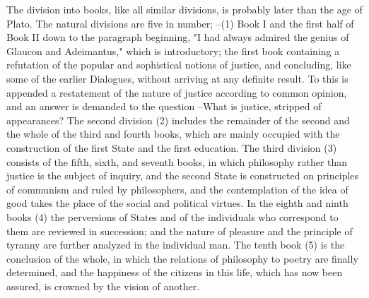 The division into books, like all similar divisions, is probably later than the age of Plato. The natural divisions are five in number; --(1) Book I and the first half of Book II down to the paragraph beginning, "I had always admired the genius of Glaucon and Adeimantus," which is introductory; the first book containing a refutation of the popular and sophistical notions of justice, and concluding, like some of the earlier Dialogues, without arriving at any definite result. To this is appended a restatement of the nature of justice according to common opinion, and an answer is demanded to the question --What is justice, stripped of appearances? The second division (2) includes the remainder of the second and the whole of the third and fourth books, which are mainly occupied with the construction of the first State and the first education. The third division (3) consists of the fifth, sixth, and seventh books, in which philosophy rather than justice is the subject of inquiry, and the second State is constructed on principles of communism and ruled by philosophers, and the contemplation of the idea of good takes the place of the social and political virtues. In the eighth and ninth books (4) the perversions of States and of the individuals who correspond to them are reviewed in succession; and the nature of pleasure and the principle of tyranny are further analyzed in the individual man. The tenth book (5) is the conclusion of the whole, in which the relations of philosophy to poetry are finally determined, and the happiness of the citizens in this life, which has now been assured, is crowned by the vision of another.

